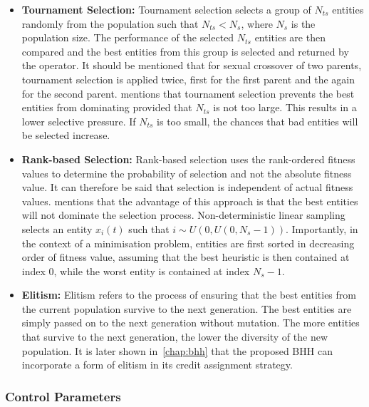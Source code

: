 \begin{itemize}
      \item \textbf{Tournament Selection: } Tournament selection selects a group of $N_{ts}$ entities randomly from the population such that $N_{ts} < N_{s}$, where $N_{s}$ is the population size. The performance of the selected $N_{ts}$ entities are then compared and the best entities from this group is selected and returned by the operator. It should be mentioned that for sexual crossover of two parents, tournament selection is applied twice, first for the first parent and the again for the second parent. \citeauthor{ref:engelbrecht:2007}\cite{ref:engelbrecht:2007} mentions that tournament selection prevents the best entities from dominating provided that $N_{ts}$ is not too large. This results in a lower selective pressure. If $N_{ts}$ is too small, the chances that bad entities will be selected increase.

      \item \textbf{Rank-based Selection: } Rank-based selection uses the rank-ordered fitness values to determine the probability of selection and not the absolute fitness value. It can therefore be said that selection is independent of actual fitness values. \citeauthor{ref:engelbrecht:2007}\cite{ref:engelbrecht:2007} mentions that the advantage of this approach is that the best entities will not dominate the selection process. Non-deterministic linear sampling selects an entity $x_{i}(t)$ such that $i \sim U(0, U(0, N_{s} - 1))$. Importantly, in the context of a minimisation problem, entities are first sorted in decreasing order of fitness value, assuming that the best heuristic is then contained at index 0, while the worst entity is contained at index $N_{s} - 1$.

      \item \textbf{Elitism: } Elitism refers to the process of ensuring that the best entities from the current population survive to the next generation. The best entities are simply passed on to the next generation without mutation. The more entities that survive to the next generation, the lower the diversity of the new population. It is later shown in~\ref{chap:bhh} that the proposed \ac{BHH} can incorporate a form of elitism in its credit assignment strategy.
\end{itemize}


\subsubsection{Control Parameters}
\label{sec:heuristics:mh:ga:control_parameters}

